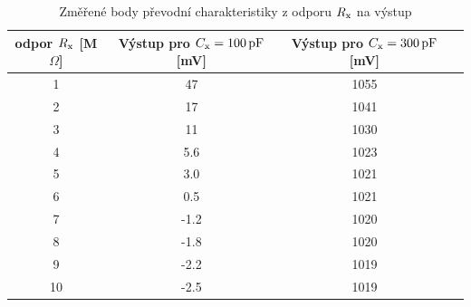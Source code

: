 \documentclass[twoside]{article}
\newcommand{\Cx}{C_{\rm x}}
\newcommand{\Rx}{R_{\rm x}}
\begin{document}
\begin{table}[h]
    \centering
    \begin{tabular}{c|c|c|c}
        odpor $\Rx$ [M$\Omega$] & Výstup pro $\Cx = \SI{100}{\pico\farad}$ [mV] & Výstup pro $\Cx = \SI{300}{\pico\farad}$ [mV] \\\hline
        1  &  47  &  1055 \\
        2  &  17  &  1041 \\
        3  &  11  &  1030 \\
        4  &  5.6  &  1023 \\
        5  &  3.0  &  1021 \\
        6  &  0.5  &  1021 \\
        7  & -1.2  &  1020 \\
        8  & -1.8  &  1020 \\
        9  & -2.2  &  1019 \\
        10 &  -2.5 &   1019 \\
    \end{tabular}
    \caption{Změřené body převodní charakteristiky z odporu $\Rx$ na výstup}
    \label{tab:mereni-r}
\end{table}
\end{document}
